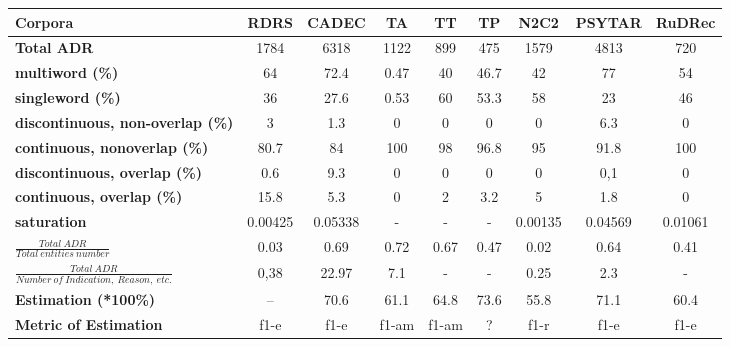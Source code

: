 \renewcommand{\arraystretch}{1.5}
\begin{tabular}{|l|c|c|c|c|c|c|c|c|} 
\hline
\textbf{Corpora}                                                         & \textbf{RDRS} & \textbf{CADEC} & \textbf{TA} & \textbf{TT} & \textbf{TP} & \textbf{N2C2} & \textbf{PSYTAR} & \textbf{RuDRec}  \\ 
\hline
\textbf{Total ADR}                                              & 1784          & 6318           & 1122        & 899         & 475         & 1579          & 4813            & 720     \\ 
\hline
\textbf{multiword (\%)}                                         & 64            & 72.4           & 0.47        & 40          & 46.7        & 42            & 77              & 54      \\ 
\hline
\textbf{singleword (\%)}                                        & 36            & 27.6           & 0.53        & 60          & 53.3        & 58            & 23              & 46      \\ 
\hline
\textbf{discontinuous, non-overlap (\%)}                        & 3             & 1.3            & 0           & 0           & 0           & 0             & 6.3             & 0       \\ 
\hline
\textbf{continuous, nonoverlap (\%)}                            & 80.7          & 84             & 100         & 98          & 96.8        & 95            & 91.8            & 100     \\ 
\hline
\textbf{discontinuous, overlap (\%)}                            & 0.6           & 9.3            & 0           & 0           & 0           & 0             & 0,1             & 0       \\ 
\hline
\textbf{continuous, overlap (\%)}                               & 15.8          & 5.3            & 0           & 2           & 3.2         & 5             & 1.8             & 0       \\ 
\hline
\textbf{saturation}
       &0.00425   &0.05338
       &- &- 
       &- &0.00135       &0.04569 &0.01061
       \\
\hline
$\frac{Total\ ADR} {Total\ entities\ number}$                      & 0.03          & 0.69           & 0.72        & 0.67        & 0.47        & 0.02          & 0.64            & 0.41    \\ 
\hline
\textbf{$\frac{Total\ ADR}{Number\ of\ Indication,\ Reason,\ etc.}$} & 0,38          & 22.97          & 7.1         & -           & -           & 0.25          & 2.3             & -       \\ 
\hline
\textbf{Estimation (*100\%)}                                             & –             & 70.6          & 61.1       & 64.8       & 73.6       & 55.8         & 71.1           & 60.4   \\ 
\hline
\textbf{Metric of Estimation}                                   & f1-e          & f1-e           & f1-am       & f1-am       & ?           & f1-r          & f1-e           & f1-e    \\
\hline
\end{tabular}